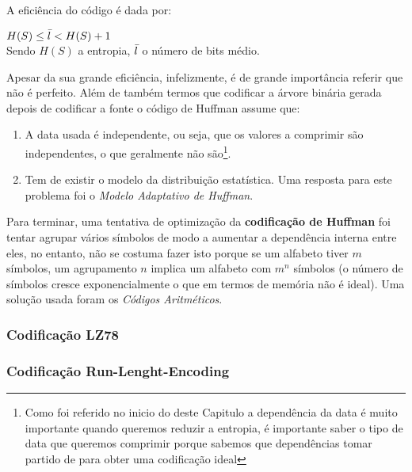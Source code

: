 \documentclass[12pt,journal,compsoc]{IEEEtran}
\begin{document}
A eficiência do código é dada por:
\begin{center}
\begin{math}H(S)\leq\Bar{l}<H(S)+1\end{math}\\
\small Sendo \begin{math}H(S)\end{math} a entropia, \begin{math}\Bar{l}\end{math} o número de bits médio.  
\end{center}

Apesar da sua grande eficiência, infelizmente, é de grande importância referir que não é perfeito. Além de também termos que codificar a árvore binária gerada depois de codificar a fonte o código de Huffman assume que:
\begin{enumerate}
    \item A data usada é independente, ou seja, que os valores a comprimir são independentes, o que geralmente não são\footnote{Como foi referido no inicio do deste Capitulo a dependência da data é muito importante quando queremos reduzir a entropia, é importante saber o tipo de data que queremos comprimir porque sabemos que dependências tomar partido de para obter uma codificação ideal}.
    \item Tem de existir o modelo da distribuição estatística. Uma resposta para este problema foi o \textit{Modelo Adaptativo de Huffman}.
\end{enumerate}


Para terminar, uma tentativa de optimização da \textbf{codificação de Huffman} foi tentar agrupar vários símbolos de modo a aumentar a dependência interna entre eles, no entanto, não se costuma fazer isto porque se um alfabeto tiver $m$ símbolos, um agrupamento $n$ implica um alfabeto com $m^n$ símbolos (o número de símbolos cresce exponencialmente o que em termos de memória não é ideal). Uma solução usada foram os \textit{Códigos Aritméticos}. %

\subsubsection{Codificação LZ78}



\subsubsection{Codificação Run-Lenght-Encoding}
\end{document}
